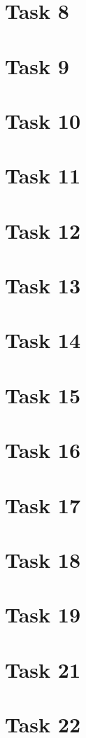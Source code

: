 \documentclass[a4paper,12pt,oneside,onecolumn]{article} %
\begin{document}
\section*{Task 8}


\section*{Task 9}


\section*{Task 10}


\section*{Task 11}


\section*{Task 12}


\section*{Task 13}


\section*{Task 14}


\section*{Task 15}


\section*{Task 16}


\section*{Task 17}


\section*{Task 18}


\section*{Task 19}


%

\section*{Task 21}


\section*{Task 22}

\end{document}
